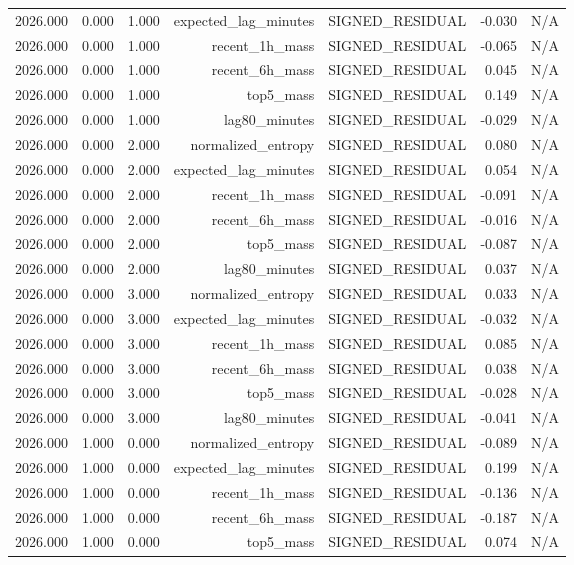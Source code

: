 \begin{table}[h!]
\begin{tabular}{lrrrrrr}
2026.000 & 0.000 & 1.000 & expected\_lag\_minutes & SIGNED\_RESIDUAL & -0.030 & N/A \\
2026.000 & 0.000 & 1.000 & recent\_1h\_mass & SIGNED\_RESIDUAL & -0.065 & N/A \\
2026.000 & 0.000 & 1.000 & recent\_6h\_mass & SIGNED\_RESIDUAL & 0.045 & N/A \\
2026.000 & 0.000 & 1.000 & top5\_mass & SIGNED\_RESIDUAL & 0.149 & N/A \\
2026.000 & 0.000 & 1.000 & lag80\_minutes & SIGNED\_RESIDUAL & -0.029 & N/A \\
2026.000 & 0.000 & 2.000 & normalized\_entropy & SIGNED\_RESIDUAL & 0.080 & N/A \\
2026.000 & 0.000 & 2.000 & expected\_lag\_minutes & SIGNED\_RESIDUAL & 0.054 & N/A \\
2026.000 & 0.000 & 2.000 & recent\_1h\_mass & SIGNED\_RESIDUAL & -0.091 & N/A \\
2026.000 & 0.000 & 2.000 & recent\_6h\_mass & SIGNED\_RESIDUAL & -0.016 & N/A \\
2026.000 & 0.000 & 2.000 & top5\_mass & SIGNED\_RESIDUAL & -0.087 & N/A \\
2026.000 & 0.000 & 2.000 & lag80\_minutes & SIGNED\_RESIDUAL & 0.037 & N/A \\
2026.000 & 0.000 & 3.000 & normalized\_entropy & SIGNED\_RESIDUAL & 0.033 & N/A \\
2026.000 & 0.000 & 3.000 & expected\_lag\_minutes & SIGNED\_RESIDUAL & -0.032 & N/A \\
2026.000 & 0.000 & 3.000 & recent\_1h\_mass & SIGNED\_RESIDUAL & 0.085 & N/A \\
2026.000 & 0.000 & 3.000 & recent\_6h\_mass & SIGNED\_RESIDUAL & 0.038 & N/A \\
2026.000 & 0.000 & 3.000 & top5\_mass & SIGNED\_RESIDUAL & -0.028 & N/A \\
2026.000 & 0.000 & 3.000 & lag80\_minutes & SIGNED\_RESIDUAL & -0.041 & N/A \\
2026.000 & 1.000 & 0.000 & normalized\_entropy & SIGNED\_RESIDUAL & -0.089 & N/A \\
2026.000 & 1.000 & 0.000 & expected\_lag\_minutes & SIGNED\_RESIDUAL & 0.199 & N/A \\
2026.000 & 1.000 & 0.000 & recent\_1h\_mass & SIGNED\_RESIDUAL & -0.136 & N/A \\
2026.000 & 1.000 & 0.000 & recent\_6h\_mass & SIGNED\_RESIDUAL & -0.187 & N/A \\
2026.000 & 1.000 & 0.000 & top5\_mass & SIGNED\_RESIDUAL & 0.074 & N/A \\

\end{tabular}
\end{table}
